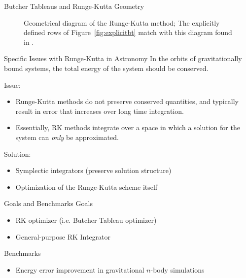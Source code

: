 \documentclass{beamer}
\begin{document}
\begin{frame}{Butcher Tableaus and Runge-Kutta Geometry}
\begin{minipage}{0.5\linewidth}
\begin{figure}[h]
            \caption[Geometrical diagram of the Runge-Kutta method] {%
                Geometrical diagram of the Runge-Kutta method;
                The explicitly defined rows of Figure~\ref{fig:explicitbt} match
                with this diagram found in \citet{geometric_numeric}.
            }
            \label{fig:rkdiagram}
        \end{figure}
    \end{minipage}
\end{frame}


\begin{frame}{Specific Issues with Runge-Kutta in Astronomy}
    In the orbits of gravitationally bound systems, the total energy of the
    system should be conserved.

    Issue:
    \begin{itemize}
        \item Runge-Kutta methods do not preserve conserved quantities, and
            typically result in error that increases over long time integration.
        \item Essentially, RK methods integrate over a space in which a solution
            for the system can \textit{only} be approximated.
    \end{itemize}

    Solution:
    \begin{itemize}
        \item Symplectic integrators (preserve solution structure)
        \item \alert{Optimization of the Runge-Kutta scheme itself}
    \end{itemize}
\end{frame}

\begin{frame}{Goals and Benchmarks}
    Goals
    \begin{itemize}
        \item RK optimizer (i.e. Butcher Tableau optimizer)
        \item General-purpose RK Integrator
    \end{itemize}

    Benchmarks
    \begin{itemize}
        \item Energy error improvement in gravitational $n$-body simulations
    \end{itemize}
\end{frame}
\end{document}

